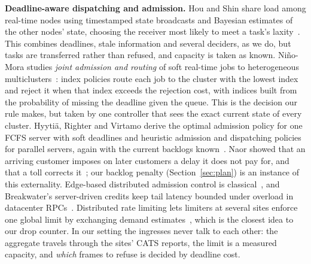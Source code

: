 \documentclass[conference]{IEEEtran}
\begin{document}
\textbf{Deadline-aware dispatching and admission.} Hou and Shin share load among real-time nodes using timestamped state broadcasts and Bayesian estimates of the other nodes' state, choosing the receiver most likely to meet a task's laxity~\cite{houshin}. This combines deadlines, stale information and several deciders, as we do, but tasks are transferred rather than refused, and capacity is taken as known. Niño-Mora studies \emph{joint admission and routing} of soft real-time jobs to heterogeneous multiclusters~\cite{ninomora}: index policies route each job to the cluster with the lowest index and reject it when that index exceeds the rejection cost, with indices built from the probability of missing the deadline given the queue. This is the decision our rule makes, but taken by one controller that sees the exact current state of every cluster. Hyytiä, Righter and Virtamo derive the optimal admission policy for one FCFS server with soft deadlines and heuristic admission and dispatching policies for parallel servers, again with the current backlogs known~\cite{hyytia}. Naor showed that an arriving customer imposes on later customers a delay it does not pay for, and that a toll corrects it~\cite{naor}; our backlog penalty (Section~\ref{sec:plan}) is an instance of this externality. Edge-based distributed admission control is classical~\cite{kelly}, and Breakwater's server-driven credits keep tail latency bounded under overload in datacenter RPCs~\cite{breakwater}. Distributed rate limiting lets limiters at several sites enforce one global limit by exchanging demand estimates~\cite{drl}, which is the closest idea to our drop counter. In our setting the ingresses never talk to each other: the aggregate travels through the sites' CATS reports, the limit is a measured capacity, and \emph{which} frames to refuse is decided by deadline cost.
\end{document}
